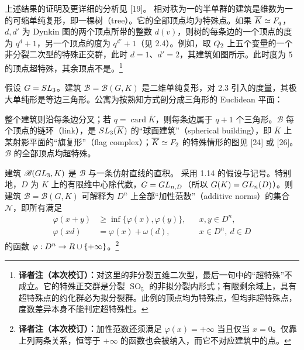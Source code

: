 上述结果的证明及更详细的分析见 [19]。
相对秩为一的半单群的建筑是维数为一的可缩单纯复形，即一棵树（tree）。它的全部顶点均为特殊点。如果 $\overline K\simeq F_q$，$d,d'$ 为 Dynkin 图的两个顶点所带的整数 $d(v)$，则树的每条边的一个顶点的度为 $q^d+1$，另一个顶点的度为 $q^{d'}+1$（见 2.4）。例如，取 $Q_2$ 上五个变量的一个非分裂二次型的特殊正交群，此时 $d=1$、$d'=2$，其建筑如图所示。此时度为 $5$ 的顶点超特殊，其余顶点不是。\footnote{\textbf{译者注（本次校订）：}对这里的非分裂五维二次型，最后一句中的“超特殊”不成立。它的特殊正交群是分裂 $\operatorname{SO}_5$ 的非拟分裂内形式；有限剩余域上，具有超特殊点的约化群必为拟分裂群。此例的顶点均为特殊点，但均非超特殊点，度数差异本身不能判定超特殊性。}
\begin{center}\end{center}
假设 $G=SL_3$。建筑 $\mathscr B=\mathscr B(G,K)$ 是二维单纯复形，对 2.3 引入的度量，其极大单纯形是等边三角形。公寓为按熟知方式剖分成三角形的 Euclidean 平面：
\begin{center}
\end{center}
整个建筑则沿每条边分叉；若 $q=\operatorname{card}\overline K$，则每条边属于 $q+1$ 个三角形。$\mathscr B$ 每个顶点的链环（link），是 $SL_3(\overline K)$ 的“球面建筑”（spherical building），即 $\overline K$ 上某射影平面的“旗复形”（flag complex）；$\overline K\simeq F_2$ 的特殊情形的图见 [24] 或 [26]。$\mathscr B$ 的全部顶点均超特殊。

建筑 $\mathscr B(GL_3,K)$ 是 $\mathscr B$ 与一条仿射直线的直积。
采用 1.14 的假设与记号。特别地，$D$ 为 $K$ 上的有限维中心除代数，$G=GL_{n,D}$（所以 $G(K)=GL_n(D)$）。则建筑 $\mathscr B=\mathscr B(G,K)$ 可解释为 $D^n$ 上全部“加性范数”（additive norms）的集合 $\mathcal N$，即所有满足
\[
\begin{aligned}
\varphi(x+y)&\geq\inf\{\varphi(x),\varphi(y)\},&&x,y\in D^n,\\
\varphi(xd)&=\varphi(x)+\omega(d),&&x\in D^n,\ d\in D
\end{aligned}
\]
的函数 $\varphi:D^n\to R\cup\{+\infty\}$。\footnote{\textbf{译者注（本次校订）：}加性范数还须满足 $\varphi(x)=+\infty$ 当且仅当 $x=0$。仅靠上列两条关系，恒等于 $+\infty$ 的函数也会被纳入，而它不对应建筑中的点。}

